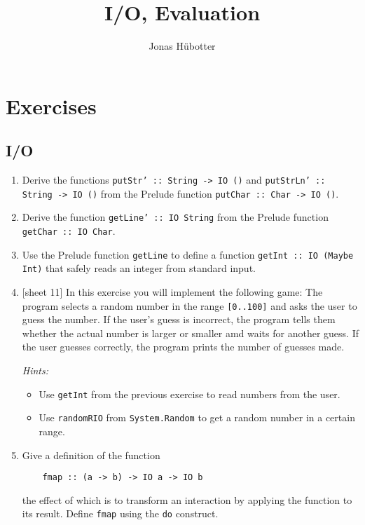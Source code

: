 \documentclass{article}
\title{I/O, Evaluation}
\author{Jonas Hübotter}
\def\code#1{\texttt{#1}}
\begin{document}
\maketitle

\section{Exercises}

\subsection{I/O}
\begin{enumerate}
    \item Derive the functions \code{putStr' :: String -> IO ()} and \code{putStrLn' :: String -> IO ()} from the Prelude function \code{putChar :: Char -> IO ()}.

    \item Derive the function \code{getLine' :: IO String} from the Prelude function \code{getChar :: IO Char}.

    \item Use the Prelude function \code{getLine} to define a function \code{getInt :: IO (Maybe Int)} that safely reads an integer from standard input.

    \item {[sheet 11]} In this exercise you will implement the following game: The program selects a random number in the range \code{[0..100]} and asks the user to guess the number. If the user's guess is incorrect, the program tells them whether the actual number is larger or smaller amd waits for another guess. If the user guesses correctly, the program prints the number of guesses made. \par
        \textit{Hints:}
        \begin{itemize}
            \item Use \code{getInt} from the previous exercise to read numbers from the user.
            \item Use \code{randomRIO} from \code{System.Random} to get a random number in a certain range.
        \end{itemize}

    \item \cite[p. 461]{thompson} Give a definition of the function
        \begin{verbatim}
    fmap :: (a -> b) -> IO a -> IO b
        \end{verbatim}
        the effect of which is to transform an interaction by applying the function to its result. Define \code{fmap} using the \code{do} construct.


\end{enumerate}
\end{document}
